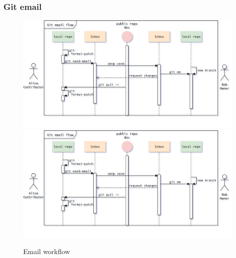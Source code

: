 \begin{frame}
    \frametitle{Git email}
    \begin{figure}
        \begin{center}
            {
                \includegraphics[height=0.7\textheight,keepaspectratio]{./images/EmailWorkflow_PrepareSecoundPatch.png}
            }
            {
                \includegraphics[height=0.75\textheight,keepaspectratio]{./images/EmailWorkflow_PrepareSecoundPatch.png}
            }
            \caption{Email workflow}
        \end{center}
    \end{figure}
\end{frame}

